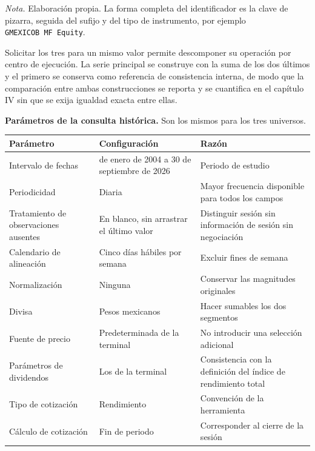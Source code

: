 \emph{Nota.} Elaboración propia. La forma completa del identificador es la clave de pizarra, seguida del sufijo y del tipo de instrumento, por ejemplo \texttt{GMEXICOB\ MF\ }\texttt{Equity}.

Solicitar los tres para un mismo valor permite descomponer su operación por centro de ejecución. La serie principal se construye con la suma de los dos últimos y el primero se conserva como referencia de consistencia interna, de modo que la comparación entre ambas construcciones se reporta y se cuantifica en el capítulo IV sin que se exija igualdad exacta entre ellas.

\textbf{Parámetros de la consulta histórica.} Son los mismos para los tres universos.


{\small
\begin{longtable}[]{@{}
  >{\raggedright\arraybackslash}p{}
  >{\raggedright\arraybackslash}p{}
  >{\raggedright\arraybackslash}p{}@{}}
\toprule\noalign{}
\begin{minipage}[b]{\linewidth}\raggedright
\textbf{Parámetro}
\end{minipage} & \begin{minipage}[b]{\linewidth}\raggedright
\textbf{Configuración}
\end{minipage} & \begin{minipage}[b]{\linewidth}\raggedright
\textbf{Razón}
\end{minipage} \\
\midrule\noalign{}
\endhead
\bottomrule\noalign{}
\endlastfoot
Intervalo de fechas & 1 de enero de 2004 a 30 de septiembre de 2026 & Periodo de estudio \\
Periodicidad & Diaria & Mayor frecuencia disponible para todos los campos \\
Tratamiento de observaciones ausentes & En blanco, sin arrastrar el último valor & Distinguir sesión sin información de sesión sin negociación \\
Calendario de alineación & Cinco días hábiles por semana & Excluir fines de semana \\
Normalización & Ninguna & Conservar las magnitudes originales \\
Divisa & Pesos mexicanos & Hacer sumables los dos segmentos \\
Fuente de precio & Predeterminada de la terminal & No introducir una selección adicional \\
Parámetros de dividendos & Los de la terminal & Consistencia con la definición del índice de rendimiento total \\
Tipo de cotización & Rendimiento & Convención de la herramienta \\
Cálculo de cotización & Fin de periodo & Corresponder al cierre de la sesión \\
\end{longtable}
}

